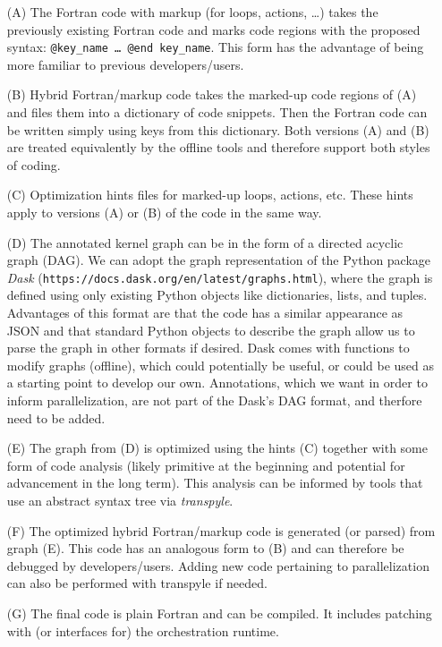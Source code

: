 \documentclass{article}
\begin{document}
\begin{enumerate}
  \item[(A)] The Fortran code with markup (for loops, actions, \ldots) takes the
    previously existing Fortran code and marks code regions with the proposed
    syntax: \texttt{@key\_name \ldots\ @end key\_name}.
    This form has the advantage of being more familiar to previous developers/users.
  \item[(B)] Hybrid Fortran/markup code takes the marked-up code regions of (A)
    and files them into a dictionary of code snippets. Then the Fortran code
    can be written simply using keys from this dictionary.  Both versions (A)
    and (B) are treated equivalently by the offline tools and therefore support
    both styles of coding.
  \item[(C)] Optimization hints files for marked-up loops, actions, etc.
    These hints apply to versions (A) or (B) of the code in the same way.
  \item[(D)] The annotated kernel graph can be in the form of a directed acyclic
    graph (DAG).  We can adopt the graph representation of the Python package
    \emph{Dask} (\texttt{https://docs.dask.org/en/latest/graphs.html}), where the
    graph is defined using only existing Python objects like dictionaries,
    lists, and tuples.  Advantages of this format are that the code has a similar
    appearance as JSON and that standard Python objects to describe the
    graph allow us to parse the graph in other formats if desired.
    Dask comes with functions to modify graphs (offline), which could
    potentially be useful, or could be used as a starting point to develop our
    own.  Annotations, which we want in order to inform parallelization, are
    not part of the Dask's DAG format, and therfore need to be added.
  \item[(E)] The graph from (D) is optimized using the hints (C) together with
    some form of code analysis (likely primitive at the beginning and potential
    for advancement in the long term).  This analysis can be informed by tools
    that use an abstract syntax tree via \emph{transpyle}.
  \item[(F)] The optimized hybrid Fortran/markup code is generated (or parsed)
    from graph (E).  This code has an analogous form to (B) and can therefore
    be debugged by developers/users.  Adding new code pertaining to
    parallelization can also be performed with transpyle if needed.
  \item[(G)] The final code is plain Fortran and can be compiled.  It includes
    patching with (or interfaces for) the orchestration runtime.
\end{enumerate}
\end{document}
